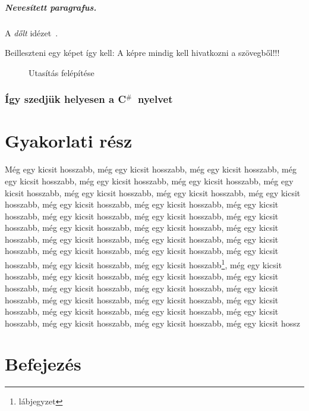 \documentclass[a4paper,oneside,onecolumn,12pt]{LegrandOrangeBook}
\begin{document}
\paragraph{Nevesített paragrafus.} A {\it dőlt}  idézet~\cite{Ubershaders:ARidiculous}.

Beilleszteni egy képet így kell: A képre mindig kell hivatkozni a szövegből!!!

\begin{figure}[ht]
    \centering
    
	\caption{Utasítás felépítése}
	\label{fig:Utasítás felépítése}
\end{figure}

\newcommand{\CS}{C${}^{\#}$}

\subsection{Így szedjük helyesen a \CS\ nyelvet}

\chapter{Gyakorlati rész}

Még egy kicsit hosszabb, még egy kicsit hosszabb, még egy kicsit hosszabb, még egy kicsit hosszabb, még egy kicsit hosszabb, még egy kicsit hosszabb, még egy kicsit hosszabb, még egy kicsit hosszabb, még egy kicsit hosszabb, még egy kicsit hosszabb, még egy kicsit hosszabb, még egy kicsit hosszabb, még egy kicsit hosszabb, még egy kicsit hosszabb, még egy kicsit hosszabb, még egy kicsit hosszabb, még egy kicsit hosszabb, még egy kicsit hosszabb, még egy kicsit hosszabb, még egy kicsit hosszabb, még egy kicsit hosszabb, még egy kicsit hosszabb, még egy kicsit hosszabb, még egy kicsit hosszabb, még egy kicsit hosszabb, még egy kicsit hosszabb, még egy kicsit hosszabb\footnote{lábjegyzet}, még egy kicsit hosszabb, még egy kicsit hosszabb, még egy kicsit hosszabb, még egy kicsit hosszabb, még egy kicsit hosszabb, még egy kicsit hosszabb, még egy kicsit hosszabb, még egy kicsit hosszabb, még egy kicsit hosszabb, még egy kicsit hosszabb, még egy kicsit hosszabb, még egy kicsit hosszabb, még egy kicsit hosszabb, még egy kicsit hosszabb, még egy kicsit hosszabb, még egy kicsit hossz

\chapter*{Befejezés}
\end{document}
